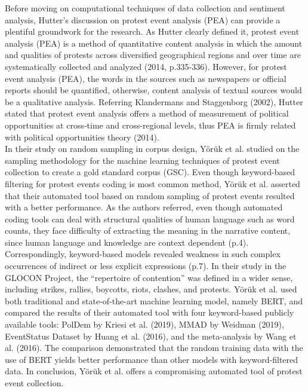 \documentclass[a4paper]{article}
\begin{document}
Before moving on computational techniques of data collection and sentiment analysis, Hutter’s discussion on protest event analysis (PEA) can provide a plentiful groundwork for the research. As Hutter clearly defined it, protest event analysis (PEA) is a method of quantitative content analysis in which the amount and qualities of protests across diversified geographical regions and over time are systematically collected and analyzed (2014, p.335-336). However, for protest event analysis (PEA), the words in the sources such as newspapers or official reports should be quantified, otherwise, content analysis of textual sources would be a qualitative analysis. Referring Klandermans and Staggenborg (2002), Hutter stated that protest event analysis offers a method of measurement of political opportunities at cross-time and cross-regional levels, thus PEA is firmly related with political opportunities theory (2014). \\
	
In their study on random sampling in corpus design, Yörük et al. studied on the sampling methodology for the machine learning techniques of protest event collection to create a gold standard corpus (GSC). Even though keyword-based filtering for protest events coding is most common method, Yörük et al. asserted that their automated tool based on random sampling of protest events resulted with a better performance. As the authors referred, even though automated coding tools can deal with structural qualities of human language such as word counts, they face difficulty of extracting the meaning in the narrative content, since human language and knowledge are context dependent (p.4). Correspondingly, keyword-based models revealed weakness in such complex occurrences of indirect or less explicit expressions (p.7). In their study in the GLOCON Project, the “repertoire of contention” was defined in a wider sense, including strikes, rallies, boycotts, riots, clashes, and protests. Yörük et al. used both traditional and state-of-the-art machine learning model, namely BERT, and compared the results of their automated tool with four keyword-based publicly available tools: PolDem by Kriesi et al. (2019), MMAD by Weidman (2019), EventStatus Dataset by Huang et al. (2016), and the meta-analysis by Wang et al. (2016). The comparison demonstrated that the random training data with the use of BERT yields better performance than other models with keyword-filtered data. In conclusion, Yörük et al. offers a compromising automated tool of protest event collection. \\
    
\end{document}
